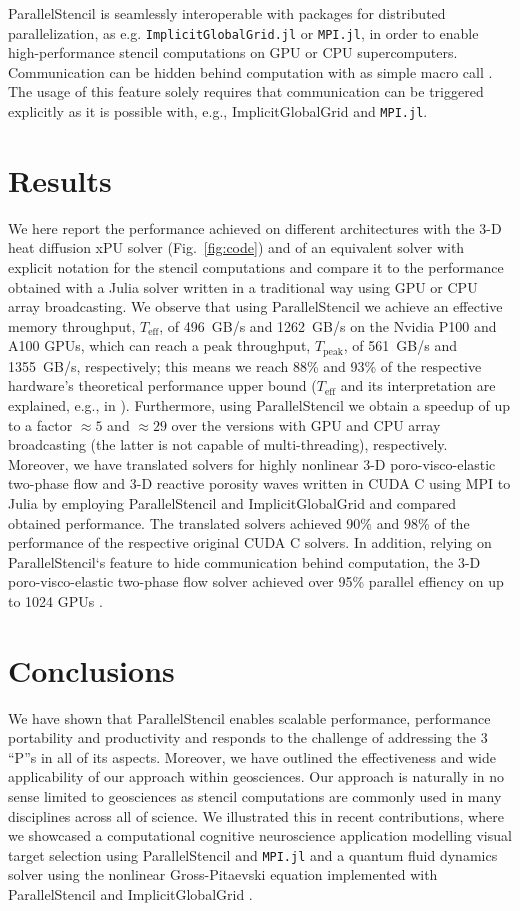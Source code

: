 \documentclass{juliacon}
\begin{document}
ParallelStencil is seamlessly interoperable with packages for distributed parallelization, as e.g. \texttt{ImplicitGlobalGrid.jl} \cite{implicitglobalgrid2022} or \texttt{MPI.jl}, in order to enable high-performance stencil computations on GPU or CPU supercomputers. Communication can be hidden behind computation with as simple macro call \cite{implicitglobalgrid2022}. The usage of this feature solely requires that communication can be triggered explicitly as it is possible with, e.g., ImplicitGlobalGrid and \texttt{MPI.jl}.

\section{Results}
We here report the performance achieved on different architectures with the 3-D heat diffusion xPU solver (Fig.~\ref{fig:code}) and of an equivalent solver with explicit notation for the stencil computations and compare it to the performance obtained with a Julia solver written in a traditional way using GPU or CPU array broadcasting. We observe that using ParallelStencil we achieve an effective memory throughput, $T_\mathrm{eff}$, of 496~GB/s and 1262~GB/s on the Nvidia P100 and A100 GPUs, which can reach a peak throughput, $T_\mathrm{peak}$, of 561~GB/s and 1355~GB/s, respectively; this means we reach 88\% and 93\% of the respective hardware's theoretical performance upper bound ($T_\mathrm{eff}$ and its interpretation are explained, e.g., in \cite{rass2022assessing}). Furthermore, using ParallelStencil we obtain a speedup of up to a factor $\approx 5$ and 
$\approx 29$ over the versions with GPU and CPU array broadcasting (the latter is not capable of multi-threading), respectively.
Moreover, we have translated solvers for highly nonlinear 3-D poro-visco-elastic two-phase flow and 3-D reactive porosity waves written in CUDA C using MPI to Julia by employing ParallelStencil and ImplicitGlobalGrid and compared obtained performance. The translated solvers achieved 90\% and 98\% of the performance of the respective original CUDA C solvers. In addition, relying on ParallelStencil`s feature to hide communication behind computation, the 3-D poro-visco-elastic two-phase flow solver achieved over 95\% parallel effiency on up to 1024 GPUs \cite{implicitglobalgrid2022}. 

\section{Conclusions}
We have shown that ParallelStencil enables scalable performance, performance portability and productivity and responds to the challenge of addressing the 3 ``P''s in all of its aspects. Moreover, we have outlined the effectiveness and wide applicability of our approach within geosciences. Our approach is naturally in no sense limited to geosciences as stencil computations are commonly used in many disciplines across all of science. We illustrated this in recent contributions, where we showcased a computational cognitive neuroscience application modelling visual target selection using ParallelStencil and \texttt{MPI.jl} \cite{pasc22} and a quantum fluid dynamics solver using the nonlinear Gross-Pitaevski equation implemented with ParallelStencil and ImplicitGlobalGrid \cite{pasc21}.
\end{document}
